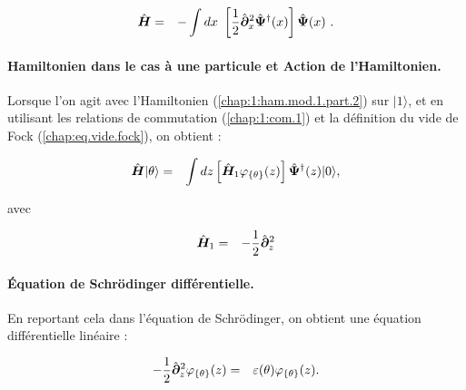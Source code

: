 \begin{eqnarray}
	\operator{H} & = & -\int dx  \left [\frac{1}{2}\operator{\partial}_x^2 \operator{\Psi}^\dag(x)\right ] \operator{\Psi}(x)  \label{chap:1:ham.mod.1.part.2}.
\end{eqnarray}


\paragraph{Hamiltonien dans le cas à une particule et Action de l’Hamiltonien. }

Lorsque l’on agit avec l’Hamiltonien (\ref{chap:1:ham.mod.1.part.2}) sur \(\vert 1 \rangle\), et en utilisant les relations de commutation (\ref{chap:1:com.1}) et la définition du vide de Fock (\ref{chap:eq.vide.fock}), on obtient : 

\begin{eqnarray}
	\hat{\bm{H}}\vert \theta \rangle & = & \int dz \left [\hat{\bm{H}}_1  \varphi_{\{\theta\}}(z)  \right ] \hat{\bm{\Psi}}^\dag (z)	 \vert 0 \rangle,	
\end{eqnarray}

avec 

\begin{eqnarray*}
		\hat{\bm{H}}_1 & = & - \frac{1}{2} \hat{\bm{\partial}}_z^2
\end{eqnarray*}


\paragraph{Équation de Schrödinger différentielle.}

En reportant cela dans l’équation de Schrödinger, on obtient une équation différentielle linéaire :

\begin{eqnarray}
	- \frac{1}{2} \hat{\bm{\partial}}_z^2 \varphi_{\{\theta\}}(z) & = & \varepsilon(\theta) \varphi_{\{\theta\}}(z). \label{chap:eq.onebody.schrod}
\end{eqnarray}




